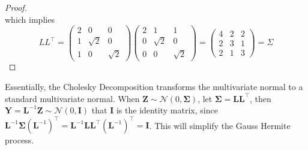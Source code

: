 \documentclass[preprint,12pt]{elsarticle}
\begin{document}
\begin{proof}
\begin{equation}
\end{equation}
which implies
\begin{equation}
    LL^{\top}=
    \begin{pmatrix}
        2 & 0 & 0 \\
        1 & \sqrt{2} & 0\\
        1 & 0 & \sqrt{2}
    \end{pmatrix}
    \begin{pmatrix}
        2 & 1 & 1 \\
        0 & \sqrt{2} & 0 \\
        0 & 0 & \sqrt{2}
    \end{pmatrix}
    =
    \begin{pmatrix}
        4 & 2 & 2\\
        2 & 3 & 1\\
        2 & 1 & 3
    \end{pmatrix}
    =\Sigma
\end{equation}
\end{proof}
Essentially, the Cholesky Decomposition transforms the multivariate normal to a standard multivariate normal. When $\mathbf{Z}\sim \mathcal{N}(0,\boldsymbol{\Sigma})$, let $\boldsymbol{\Sigma}=\mathbf{L}\mathbf{L}^{\top}$, then $\mathbf{Y}=\mathbf{L}^{-1}\mathbf{Z}\sim \mathcal{N}(0, \mathbf{I})$ that $\mathbf{I}$ is the identity matrix, since $\mathbf{L}^{-1}\boldsymbol{\Sigma}(\mathbf{L}^{-1})^{\top}=\mathbf{L}^{-1}\mathbf{L}\mathbf{L}^{\top}(\mathbf{L}^{-1})^{\top}=\mathbf{I}$. This will simplify the Gauss Hermite process. 
\end{document}
